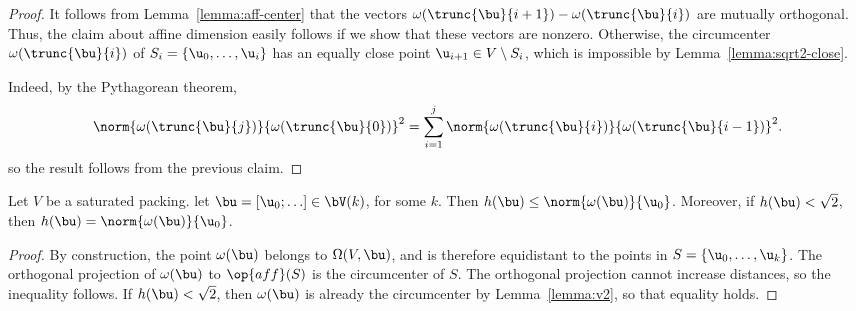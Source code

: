 \begin{proof}
It follows from  Lemma~\ref{lemma:aff-center} that the vectors 
${\omega(\trunc{\bu}{i+1})}-{\omega(\trunc{\bu}{i})}$ are mutually orthogonal.
Thus, the claim about affine dimension easily follows if we show that these vectors
are nonzero.
Otherwise, the
circumcenter $\omega(\trunc{\bu}{i})$ of $S_i=\{\u_0,\ldots,\u_i\}$
has an equally close point $ \u_{i+1}\in V\setminus S_i$, which is
impossible by Lemma~\ref{lemma:sqrt2-close}.

Indeed, by the Pythagorean theorem,
\begin{equation} 
\norm{\omega(\trunc{\bu}{j})}{\omega(\trunc{\bu}{0})}^2 =
\sum_{i=1}^{j} \norm{\omega(\trunc{\bu}{i})}{\omega(\trunc{\bu}{i-1})}^2.
\end{equation}
so the result follows from the
previous claim.
\end{proof}



\begin{lemma}
  Let $V$ be a saturated packing.  let $\bu =[\u_0;\ldots]\in
  \bV(k)$, for some $k$.  Then $h(\bu)\le
  \norm{\omega(\bu)}{\u_0}$.  Moreover, if $h(\bu)<\sqrt2$, then
  $h(\bu)=\norm{\omega(\bu)}{\u_0}$.
\end{lemma}

\begin{proof} By construction, the point $\omega(\bu)$ belongs to
  $\Omega(V,\bu)$, and is therefore equidistant to the points in
  $S=\{\u_0,\ldots,\u_k\}$.  The orthogonal projection of
  $\omega(\bu)$ to $\op{aff}(S)$ is the circumcenter of $S$.  The
  orthogonal projection cannot increase distances, so the inequality
  follows.  If $h(\bu)<\sqrt2$, then $\omega(\bu)$ is already the
  circumcenter by Lemma~\ref{lemma:v2}, so that equality holds.
\end{proof}

